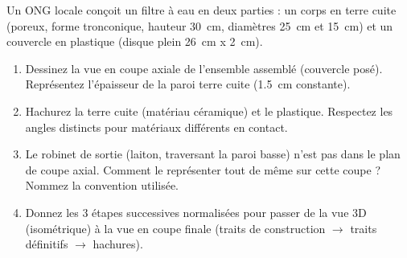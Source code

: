 \documentclass[11pt]{article}
\begin{document}
\begin{exercice}
Un ONG locale conçoit un filtre à eau en deux parties : un corps en terre cuite (poreux, forme tronconique, hauteur \SI{30}{\centi\metre}, diamètres \SI{25}{\centi\metre} et \SI{15}{\centi\metre}) et un couvercle en plastique (disque plein \SI{26}{\centi\metre} x \SI{2}{\centi\metre}).
\begin{enumerate}
    \item Dessinez la vue en coupe axiale de l'ensemble assemblé (couvercle posé). Représentez l'épaisseur de la paroi terre cuite (\SI{1,5}{\centi\metre} constante).
    \item Hachurez la terre cuite (matériau céramique) et le plastique. Respectez les angles distincts pour matériaux différents en contact.
    \item Le robinet de sortie (laiton, traversant la paroi basse) n'est pas dans le plan de coupe axial. Comment le représenter tout de même sur cette coupe ? Nommez la convention utilisée.
    \item Donnez les 3 étapes successives normalisées pour passer de la vue 3D (isométrique) à la vue en coupe finale (traits de construction $\rightarrow$ traits définitifs $\rightarrow$ hachures).
\end{enumerate}
\end{exercice}
\end{document}
